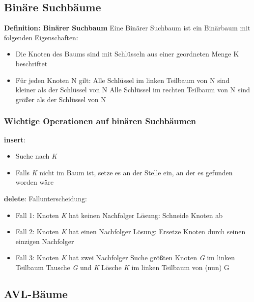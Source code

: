 \documentclass[12pt]{article}
\begin{document}
\newpage
\subsection{Binäre Suchbäume}

\textbf{Definition: Binärer Suchbaum} \newline
Eine Binärer Suchbaum ist ein Binärbaum mit folgenden Eigenschaften:
\begin{itemize}
	\item Die Knoten des Baums sind mit Schlüsseln aus einer geordneten Menge K beschriftet
	\item Für jeden Knoten N gilt:
	\subitem \small{Alle Schlüssel im linken Teilbaum von N sind kleiner als der Schlüssel von N}
	\subitem \small{Alle Schlüssel im rechten Teilbaum von N sind größer als der Schlüssel von N}
\end{itemize}

\subsubsection{Wichtige Operationen auf binären Suchbäumen}

\textbf{insert}:
\begin{itemize}
	\item Suche nach \textit{K}
	\item Falls \textit{K} nicht im Baum ist, setze es an der Stelle ein, an der es gefunden worden wäre
\end{itemize}


\textbf{delete}:
Fallunterscheidung:
\begin{itemize}
	\item Fall 1: Knoten \textit{K} hat keinen Nachfolger
	\subitem Lösung: Schneide Knoten ab
	\item Fall 2: Knoten \textit{K} hat einen Nachfolger
	\subitem Lösung: Ersetze Knoten durch seinen einzigen Nachfolger
	\item Fall 3: Knoten \textit{K} hat zwei Nachfolger
	\subitem Suche größten Knoten \textit{G} im linken Teilbaum
	\subitem Tausche \textit{G} und \textit{K}
	\subitem Lösche \textit{K} im linken Teilbaum von (nun) G
\end{itemize}
\newpage
\subsection{AVL-Bäume}
\end{document}

